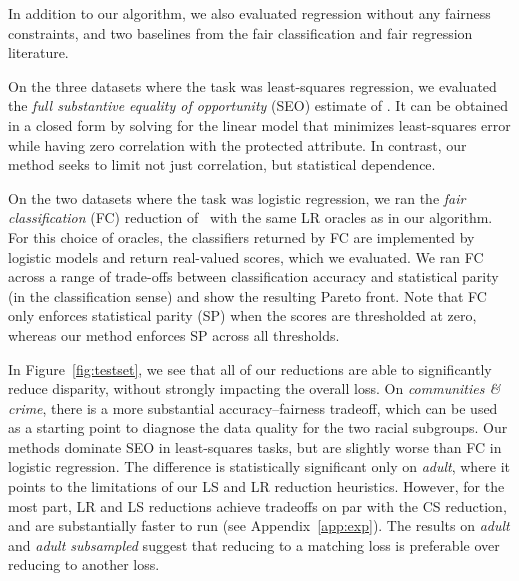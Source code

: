 \documentclass{article}
\begin{document}
In addition to our algorithm, we also evaluated regression without any fairness constraints,
and two baselines from the fair classification and fair regression literature.

On the three datasets where the task was least-squares regression, we evaluated the \emph{full
  substantive equality of opportunity} (SEO) estimate of
\citet{johnson2016impartial}. It can be obtained in a closed form by solving for the
linear model that minimizes least-squares error while having zero correlation with
the protected attribute. In contrast, our method seeks
to limit not just correlation, but statistical dependence.

On the two datasets where the task was logistic regression, we ran the \emph{fair classification} (FC)
reduction of~\citet{agarwal2018reductions} with the same LR oracles as in our algorithm.
For this choice of oracles, the classifiers returned by FC
are implemented by logistic models and return real-valued scores, which we evaluated.
We ran FC across a range of trade-offs between classification accuracy
and statistical parity (in the classification sense) and show the resulting Pareto front.
Note that
FC only enforces statistical parity (SP) when the scores are thresholded at zero, whereas our method
enforces SP across all thresholds.

In Figure~\ref{fig:testset}, we see that all of our reductions are able to significantly reduce disparity, without strongly impacting the overall loss. On \emph{communities \& crime}, there is a more substantial accuracy--fairness tradeoff, which can  be used as a starting point to diagnose the data quality for the two racial subgroups.
Our methods dominate SEO in least-squares tasks, but are slightly worse than FC in logistic regression.
The difference is statistically significant only on \emph{adult}, where it points to the limitations of our LS and LR reduction heuristics.
However, for the most part, LR and LS reductions achieve tradeoffs on par with the CS reduction, and are substantially faster to run (see Appendix~\ref{app:exp}). The results on \emph{adult} and \emph{adult subsampled} suggest that reducing to a matching loss is preferable over reducing to another loss.
\end{document}
